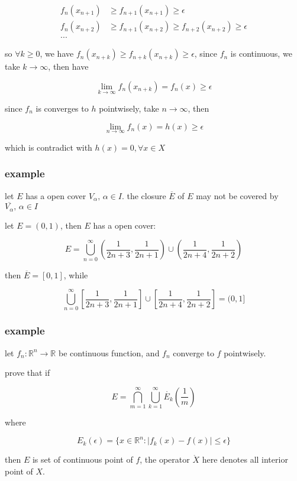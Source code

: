 \documentclass[11pt,a4paper]{article}
\begin{document}
\begin{align*}
f_n(x_{n+1}) &\ge f_{n+1}(x_{n+1}) \ge \epsilon \\
f_n(x_{n+2}) &\ge f_{n+1}(x_{n+2}) \ge  f_{n+2}(x_{n+2}) \ge \epsilon \\
...
\end{align*}

so $\forall k \ge 0$, we have $f_n(x_{n+k}) \ge f_{n+k}(x_{n+k}) \ge \epsilon$, since $f_n$ is continuous, we take $k \to \infty$, then have

\[
\lim_{k \to \infty}f_n(x_{n + k}) = f_n(x) \ge \epsilon
\]

since $f_n$ is converges to $h$ pointwisely, take $n \to \infty$, then

\[
\lim_{n \to \infty}f_n(x) = h(x) \ge \epsilon
\]

which is contradict with $h(x) = 0, \forall x \in X$

\subsubsection{example}

let $E$ has a open cover $V_{\alpha},\, \alpha \in I$. the closure $\overline{E}$ of $E$ may not be covered by $\overline{V_{\alpha}},\, \alpha \in I$

let $E=(0,1)$, then $E$ has a open cover:

\[
E = \bigcup_{n=0}^{\infty}(\frac{1}{2n+3}, \frac{1}{2n+1}) \cup (\frac{1}{2n+4}, \frac{1}{2n+2})
\]

then $\overline{E} = [0,1]$, while 

\[
\bigcup_{n=0}^{\infty}[\frac{1}{2n+3}, \frac{1}{2n+1}] \cup [\frac{1}{2n+4}, \frac{1}{2n+2}] = (0,1]
\]

\subsubsection{example}

let $f_n: \mathbb{R}^n \to \mathbb{R}$ be continuous function, and $f_n$ converge to $f$ pointwisely. 

prove that if

\[
    E = \bigcap_{m=1}^{\infty}\bigcup_{k=1}^{\infty} \mathring{E_k}(\frac{1}{m})
\]


    where 

    \[
    E_k(\epsilon) = \{ x \in \mathbb{R}^n : |f_k(x) - f(x)| \le \epsilon \}
    \]


then $E$ is set of continuous point of $f$, the operator $\mathring{X}$ here denotes all interior point of $X$.
\end{document}
